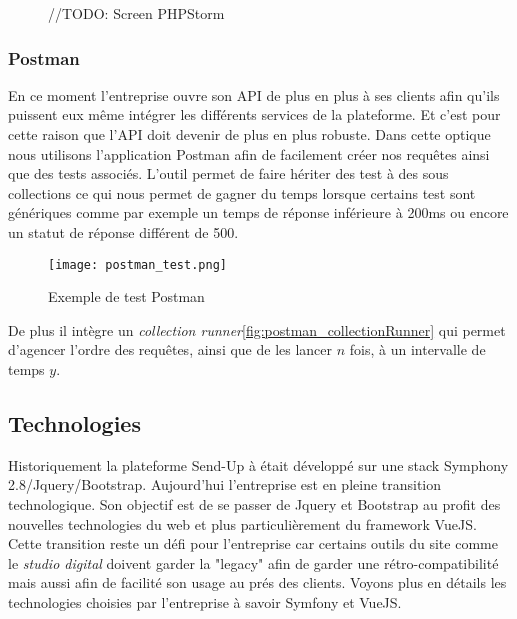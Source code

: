 \begin{figure}[htbp]
    \center 
    //TODO: Screen PHPStorm
\end{figure}


\subsubsection{Postman}

En ce moment l'entreprise ouvre son API de plus en plus à ses clients afin qu'ils puissent eux même intégrer les différents services de la plateforme. Et c'est pour cette raison que l'API doit devenir de plus en plus robuste. Dans cette optique nous utilisons l'application Postman afin de facilement créer nos requêtes ainsi que des tests associés. L'outil permet de faire hériter des test à des sous collections ce qui nous permet de gagner du temps lorsque certains test sont génériques comme par exemple un temps de réponse inférieure à 200ms ou encore un statut de réponse différent de 500. 

\begin{figure}[htbp]
    \center
        \texttt{[image: postman\_test.png]}
        \caption{Exemple de test Postman}
\end{figure}

De plus il intègre un \textit{collection runner}\ref{fig:postman_collectionRunner} qui permet d'agencer l'ordre des requêtes, ainsi que de les lancer $n$ fois, à un intervalle de temps $y$. 


\subsection{Technologies}

Historiquement la plateforme Send-Up à était développé sur une stack Symphony 2.8/Jquery/Bootstrap. Aujourd'hui l'entreprise est en pleine transition technologique. Son objectif est de se passer de Jquery et Bootstrap au profit des nouvelles technologies du web et plus particulièrement du framework VueJS. Cette transition reste un défi pour l'entreprise car certains outils du site comme le \textit{studio digital} doivent garder la "legacy" afin de garder une rétro-compatibilité mais aussi afin de facilité son usage au prés des clients. Voyons plus en détails les technologies choisies par l'entreprise à savoir Symfony et VueJS.

